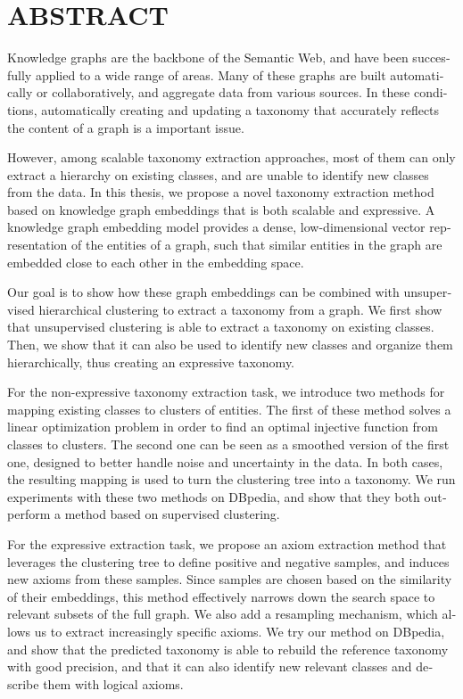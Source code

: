 %

\chapter*{ABSTRACT}\thispagestyle{headings}
%
\begin{otherlanguage}{english}

Knowledge graphs are the backbone of the Semantic Web, and have been succesfully applied to a wide range of areas. Many of these graphs are built automatically or collaboratively, and aggregate data from various sources. In these conditions, automatically creating and updating a taxonomy that accurately reflects the content of a graph is a important issue.

However, among scalable taxonomy extraction approaches, most of them can only extract a hierarchy on existing classes, and are unable to identify new classes from the data. In this thesis, we propose a novel taxonomy extraction method based on knowledge graph embeddings that is both scalable and expressive. A knowledge graph embedding model provides a dense, low-dimensional vector representation of the entities of a graph, such that similar entities in the graph are embedded close to each other in the embedding space.

Our goal is to show how these graph embeddings can be combined with unsupervised hierarchical clustering to extract a taxonomy from a graph. We first show that unsupervised clustering is able to extract a taxonomy on existing classes. Then, we show that it can also be used to identify new classes and organize them hierarchically, thus creating an expressive taxonomy.

For the non-expressive taxonomy extraction task, we introduce two methods for mapping existing classes to clusters of entities. The first of these method solves a linear optimization problem in order to find an optimal injective function from classes to clusters. The second one can be seen as a smoothed version of the first one, designed to better handle noise and uncertainty in the data. In both cases, the resulting mapping is used to turn the clustering tree into a taxonomy. We run experiments with these two methods on DBpedia, and show that they both outperform a method based on supervised clustering.

For the expressive extraction task, we propose an axiom extraction method that leverages the clustering tree to define positive and negative samples, and induces new axioms from these samples. Since samples are chosen based on the similarity of their embeddings, this method effectively narrows down the search space to relevant subsets of the full graph. We also add
a resampling mechanism, which allows us to extract increasingly specific axioms.
We try our method on DBpedia, and show that the predicted taxonomy is able to rebuild the reference taxonomy with good precision, and that it can also identify new relevant classes and describe them with logical axioms.


\end{otherlanguage}
